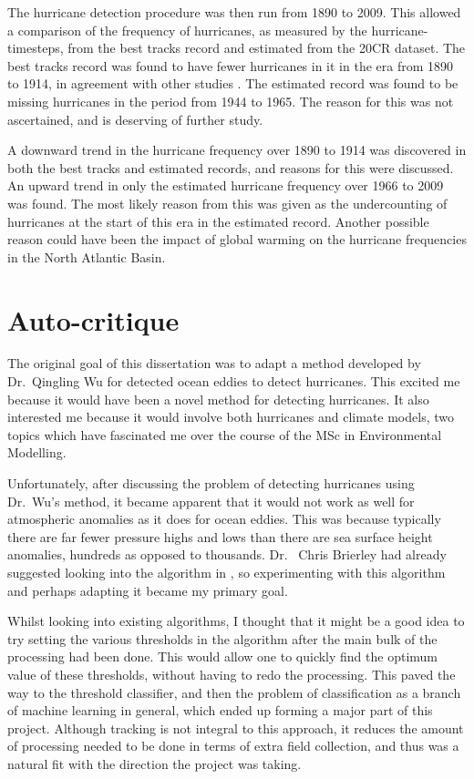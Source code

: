 \documentclass[pdftex,12pt,a4paper]{report}
\begin{document}
The hurricane detection procedure was then run from 1890 to 2009. This allowed a comparison of the
frequency of hurricanes, as measured by the hurricane-timesteps, from the best tracks record and
estimated from the 20CR dataset. The best tracks record was found to have fewer hurricanes in it in
the era from 1890 to 1914, in agreement with other studies \parencite{vecchi2008estimates,
landsea2007counting}. The estimated record was found to be missing hurricanes in the period from
1944 to 1965. The reason for this was not ascertained, and is deserving of further study.

A downward trend in the hurricane frequency over 1890 to 1914 was discovered in both the best
tracks and estimated records, and reasons for this were discussed. An upward trend in only the
estimated hurricane frequency over 1966 to 2009 was found. The most likely reason from this was
given as the undercounting of hurricanes at the start of this era in the estimated record. Another
possible reason could have been the impact of global warming on the hurricane frequencies in the
North Atlantic Basin.

\chapter*{Auto-critique}

The original goal of this dissertation was to adapt a method developed by Dr.~Qingling Wu for
detected ocean eddies to detect hurricanes. This excited me because it would have been a novel
method for detecting hurricanes. It also interested me because it would involve both hurricanes and
climate models, two topics which have fascinated me over the course of the MSc in Environmental
Modelling.

Unfortunately, after discussing the problem of detecting hurricanes using Dr.~Wu's method, it became
apparent that it would not work as well for atmospheric anomalies as it does for ocean eddies. This
was because typically there are far fewer pressure highs and lows than there are sea surface height
anomalies, hundreds as opposed to thousands. Dr.~ Chris Brierley had already suggested looking into
the algorithm in \textcite{walsh1997objective}, so experimenting with this algorithm and perhaps
adapting it became my primary goal.

Whilst looking into existing algorithms, I thought that it might be a good idea to try setting the
various thresholds in the algorithm after the main bulk of the processing had been done. This would
allow one to quickly find the optimum value of these thresholds, without having to redo the
processing. This paved the way to the threshold classifier, and then the problem of classification
as a branch of machine learning in general, which ended up forming a major part of this project.
Although tracking is not integral to this approach, it reduces the amount of processing needed to be
done in terms of extra field collection, and thus was a natural fit with the direction the project
was taking.
\end{document}
